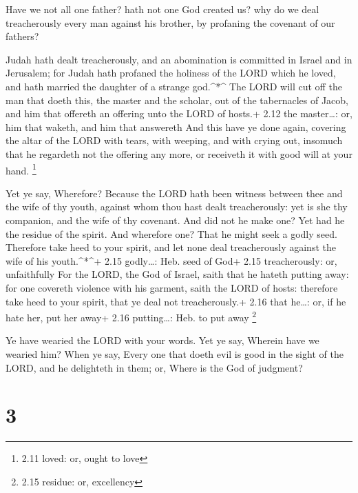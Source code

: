  Have we not all one father? hath not one God created us?
why do we deal treacherously every man against his brother, by profaning
the covenant of our fathers?

 Judah hath dealt treacherously, and an abomination is
committed in Israel and in Jerusalem; for Judah hath profaned the
holiness of the LORD which he loved, and hath married the daughter of a
strange god.\^{}*\^{}  The LORD will cut off the man that
doeth this, the master and the scholar, out of the tabernacles of Jacob,
and him that offereth an offering unto the LORD of hosts.+ 2.12 the
master\ldots: or, him that waketh, and him that answereth 
And this have ye done again, covering the altar of the LORD with tears,
with weeping, and with crying out, insomuch that he regardeth not the
offering any more, or receiveth it with good will at your hand.
\footnote{2.11 loved: or, ought to love}

 Yet ye say, Wherefore? Because the LORD hath been witness
between thee and the wife of thy youth, against whom thou hast dealt
treacherously: yet is she thy companion, and the wife of thy covenant.
 And did not he make one? Yet had he the residue of the
spirit. And wherefore one? That he might seek a godly seed. Therefore
take heed to your spirit, and let none deal treacherously against the
wife of his youth.\^{}*\^{}+ 2.15 godly\ldots: Heb. seed of God+ 2.15
treacherously: or, unfaithfully  For the LORD, the God of
Israel, saith that he hateth putting away: for one covereth violence
with his garment, saith the LORD of hosts: therefore take heed to your
spirit, that ye deal not treacherously.+ 2.16 that he\ldots: or, if he
hate her, put her away+ 2.16 putting\ldots: Heb. to put away \footnote{2.15
  residue: or, excellency}

 Ye have wearied the LORD with your words. Yet ye say,
Wherein have we wearied him? When ye say, Every one that doeth evil is
good in the sight of the LORD, and he delighteth in them; or, Where is
the God of judgment?

\hypertarget{section-2}{%
\section{3}\label{section-2}}

